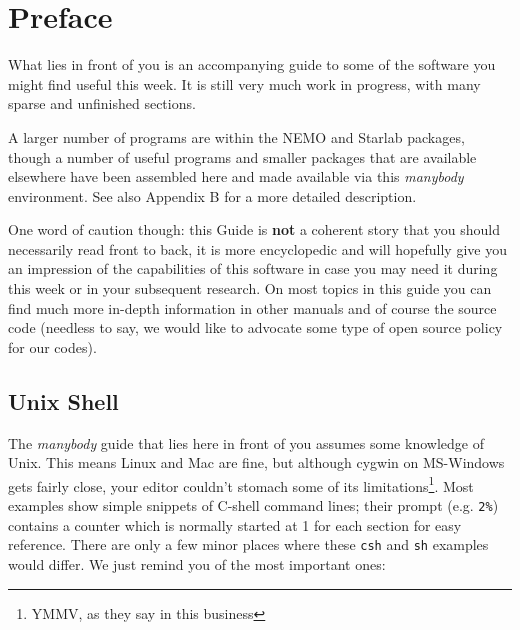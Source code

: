 \chapter*{Preface}

What lies in front of you is an accompanying guide to some of 
the software you might find useful this week.
It is still very much work in progress, with many sparse and
unfinished sections.


A larger number of programs are within the NEMO and Starlab packages, 
though a number of useful programs and smaller packages
that are available elsewhere have been assembled here
and made available via this {\it manybody} environment.
See also Appendix B for a more detailed description.

One word of caution though: this Guide is {\bf not} a coherent
story that you should necessarily read front to back, it is more encyclopedic
and will hopefully give you an impression of the capabilities
of this software in case you may need it during this week or in
your subsequent research. On most topics in this guide you can find
much more in-depth information in other manuals and of course 
the source code (needless to say, we would like to advocate some
type of open source policy for our codes).

%

\section*{Unix Shell}

The {\it manybody} guide that lies here in front of you assumes some knowledge
of Unix. This means Linux and Mac are fine, but although cygwin on MS-Windows
gets fairly close, your editor couldn't stomach some of 
its limitations\footnote{YMMV, as they say in this business}.
Most examples show simple snippets
of C-shell command lines; their prompt (e.g. \verb+2%+) 
contains a counter which is normally started at 1 for each section
for easy reference.
There are only a few minor places where these {\tt csh} and 
{\tt sh} examples would differ. We just remind you of
the most important ones:

